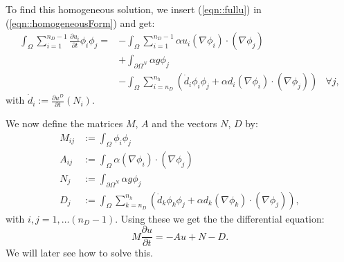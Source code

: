 To find this homogeneous solution, we insert (\ref{eqn::fullu}) in (\ref{eqn::homogeneousForm}) and get:
\begin{equation}
\label{eqn::finalDiscreticedForm}
\begin{aligned}
	\int_{\Omega} \sum_{i=1}^{n_D-1} \frac{\partial u_i}{\partial t} \phi_i \phi_j = &-\int_{\Omega} \sum_{i=1}^{n_D-1} \alpha u_i(\nabla \phi_i) \cdot (\nabla \phi_j) \\
	&+ \int_{\partial\Omega^N} \alpha g\phi_j \\
	&-	\int_{\Omega} \sum_{i=n_D}^{n_h}\left( \dot{d}_i \phi_i \phi_j  + \alpha d_i(\nabla \phi_i) \cdot (\nabla \phi_j)\right)
	 & \forall j,
\end{aligned}
\end{equation}
with $\dot{d}_i:=\frac{\partial u^D}{\partial t}(N_i)$.

We now define the matrices $M$, $A$ and the vectors $N$, $D$ by:
\begin{align*}
	M_{ij} &:=\int_{\Omega} \phi_i \phi_j \\
	A_{ij} &:=\int_{\Omega} \alpha (\nabla \phi_i) \cdot (\nabla \phi_j) \\
	N_{j} &:=\int_{\partial\Omega^N} \alpha g\phi_j \\
	D_{j} &:=\int_{\Omega} \sum_{k=n_D}^{n_h}\left( \dot{d}_k \phi_k \phi_j  + \alpha d_k(\nabla \phi_k) \cdot (\nabla \phi_j)\right),
\end{align*}
with $i,j=1,\dots (n_D-1)$. Using these we get the the differential equation:
\begin{equation}
	\label{eqn::matrixForm}
	M\frac{\partial u}{\partial t} = -A u + N - D.
\end{equation}
We will later see how to solve this.